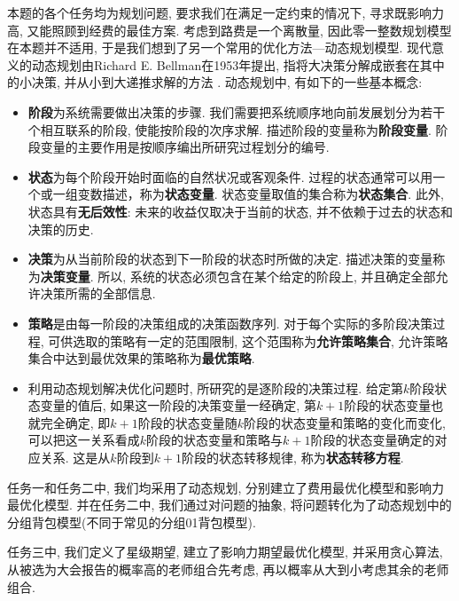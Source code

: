     本题的各个任务均为规划问题, 要求我们在满足一定约束的情况下,
    寻求既影响力高, 又能照顾到经费的最佳方案.
    考虑到路费是一个离散量, 因此零一整数规划模型在本题并不适用,
    于是我们想到了另一个常用的优化方法---动态规划模型.
    现代意义的动态规划由Richard E. Bellman在1953年提出,
    指将大决策分解成嵌套在其中的小决策, 并从小到大递推求解的方法 \citep{R.Bellman_2002}.
    动态规划中, 有如下的一些基本概念:\citep{H.W.Zhang_2008}
    \begin{itemize}
        \item \textbf{阶段}为系统需要做出决策的步骤.
                我们需要把系统顺序地向前发展划分为若干个相互联系的阶段,
                使能按阶段的次序求解.
                描述阶段的变量称为\textbf{阶段变量}.
                阶段变量的主要作用是按顺序编出所研究过程划分的编号.
        \item \textbf{状态}为每个阶段开始时面临的自然状况或客观条件.
                过程的状态通常可以用一个或一组变数描述，称为\textbf{状态变量}.
                状态变量取值的集合称为\textbf{状态集合}.
                此外, 状态具有\textbf{无后效性}: 未来的收益仅取决于当前的状态,
                并不依赖于过去的状态和决策的历史.
        \item \textbf{决策}为从当前阶段的状态到下一阶段的状态时所做的决定.
                描述决策的变量称为\textbf{决策变量}.
                所以, 系统的状态必须包含在某个给定的阶段上, 
                并且确定全部允许决策所需的全部信息.
        \item \textbf{策略}是由每一阶段的决策组成的决策函数序列.
                对于每个实际的多阶段决策过程,
                可供选取的策略有一定的范围限制,
                这个范围称为\textbf{允许策略集合},
                允许策略集合中达到最优效果的策略称为\textbf{最优策略}.
        \item 利用动态规划解决优化问题时, 所研究的是逐阶段的决策过程.
                给定第$k$阶段状态变量的值后, 如果这一阶段的决策变量一经确定,
                第$k+1$阶段的状态变量也就完全确定,
                即$k+1$阶段的状态变量随$k$阶段的状态变量和策略的变化而变化,
                可以把这一关系看成$k$阶段的状态变量和策略与$k+1$阶段的状态变量确定的对应关系.
                这是从$k$阶段到$k+1$阶段的状态转移规律,
                称为\textbf{状态转移方程}.
    \end{itemize}
    
    任务一和任务二中, 我们均采用了动态规划, 分别建立了费用最优化模型和影响力最优化模型.
    并在任务二中, 我们通过对问题的抽象,
    将问题转化为了动态规划中的分组背包模型(不同于常见的分组01背包模型).
    
    任务三中, 我们定义了星级期望, 建立了影响力期望最优化模型,
    并采用贪心算法, 从被选为大会报告的概率高的老师组合先考虑,
    再以概率从大到小考虑其余的老师组合.
